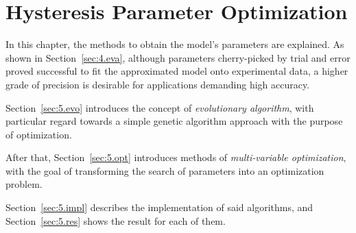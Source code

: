 
\chapter{Hysteresis Parameter Optimization}
\label{ch:optimization}

In this chapter, the methods to obtain the model's parameters are explained.
As shown in Section~\ref{sec:4.eva}, although parameters cherry-picked by trial
and error proved successful to fit the approximated model onto experimental data,
a higher grade of precision is desirable for applications demanding high accuracy.

Section~\ref{sec:5.evo} introduces the concept of \textit{evolutionary algorithm},
with particular regard towards a simple genetic algorithm approach
with the purpose of optimization.

After that, Section~\ref{sec:5.opt} introduces methods of \textit{multi-variable
optimization}, with the goal of transforming the search of parameters
into an optimization problem.

Section~\ref{sec:5.impl} describes the implementation of said algorithms,
and Section~\ref{sec:5.res} shows the result for each of them.


